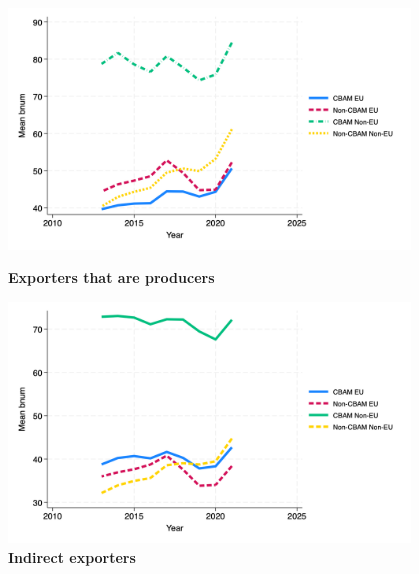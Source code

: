 \documentclass{article}
\begin{document}
\begin{figure}[H]
\centering
\includegraphics[width=0.95\textwidth]{bnum_ep.png}
\caption{\textbf{Exporters that are producers}}
\includegraphics[width=0.95\textwidth]{bnum_indir.png}
\caption{\textbf{Indirect exporters}}
\end{figure}
\end{document}
